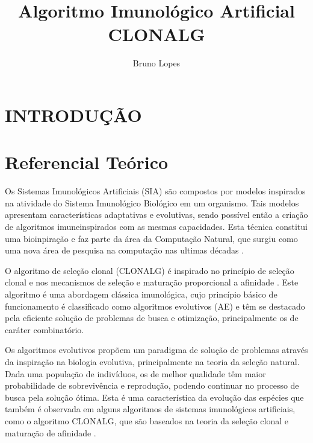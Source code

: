 \documentclass[conference]{IEEEtran}
\begin{document}
\title{Algoritmo Imunológico Artificial CLONALG}

\author{Bruno Lopes}
\maketitle

\begin{abstract}


\end{abstract}

\section{INTRODUÇÃO}

\section{Referencial Teórico}
	Os Sistemas Imunológicos Artificiais (SIA) são compostos por modelos inspirados na atividade do Sistema Imunológico Biológico em um organismo. Tais modelos apresentam características adaptativas e evolutivas, sendo possível então a criação de algoritmos imuneinspirados com as mesmas capacidades. Esta técnica constitui uma bioinpiração e faz parte da área da Computação Natural, que surgiu como uma nova área de pesquisa na computação nas ultimas décadas \cite{LNCASTRO}.

    O algoritmo de seleção clonal (CLONALG) é inspirado no princípio de seleção clonal e nos mecanismos de  seleção e  maturação proporcional a afinidade  \cite{LNCASTRO2}. Este algoritmo é  uma abordagem clássica imunológica, cujo princípio básico de funcionamento é classificado como algoritmos evolutivos (AE) e têm se destacado pela eficiente solução de problemas de busca e otimização, principalmente os de caráter combinatório. 
    
    Os  algoritmos evolutivos  propõem um  paradigma de  solução  de problemas  através  da inspiração  na  biologia  evolutiva,  principalmente  na  teoria  da  seleção  natural.  Dada  uma população de indivíduos, os de melhor qualidade têm maior probabilidade de sobrevivência e reprodução,  podendo  continuar  no  processo  de  busca  pela  solução  ótima.  Esta  é  uma característica  da  evolução  das  espécies  que  também é  observada  em alguns  algoritmos  de sistemas imunológicos artificiais, como o algoritmo CLONALG, que são baseados na teoria da seleção clonal e maturação de afinidade \cite{LNCASTRO2}.
    
\end{document}
